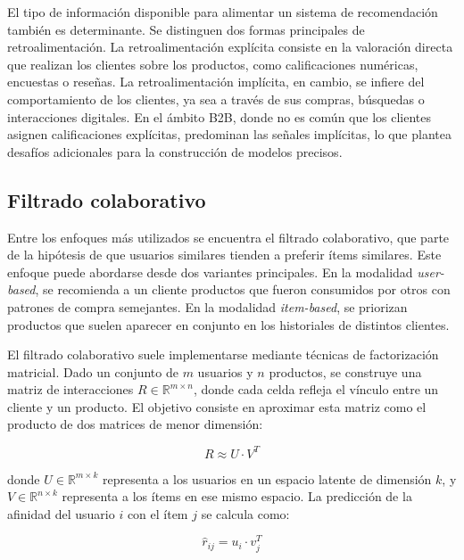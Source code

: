 El tipo de información disponible para alimentar un sistema de recomendación también es determinante. Se distinguen dos formas principales de retroalimentación. La retroalimentación explícita consiste en la valoración directa que realizan los clientes sobre los productos, como calificaciones numéricas, encuestas o reseñas. La retroalimentación implícita, en cambio, se infiere del comportamiento de los clientes, ya sea a través de sus compras, búsquedas o interacciones digitales. En el ámbito B2B, donde no es común que los clientes asignen calificaciones explícitas, predominan las señales implícitas, lo que plantea desafíos adicionales para la construcción de modelos precisos.

\subsection{Filtrado colaborativo}

Entre los enfoques más utilizados se encuentra el filtrado colaborativo, que parte de la hipótesis de que usuarios similares tienden a preferir ítems similares. Este enfoque puede abordarse desde dos variantes principales. En la modalidad \textit{user-based}, se recomienda a un cliente productos que fueron consumidos por otros con patrones de compra semejantes. En la modalidad \textit{item-based}, se priorizan productos que suelen aparecer en conjunto en los historiales de distintos clientes. 

El filtrado colaborativo suele implementarse mediante técnicas de factorización matricial. Dado un conjunto de $m$ usuarios y $n$ productos, se construye una matriz de interacciones $R \in \mathbb{R}^{m \times n}$, donde cada celda refleja el vínculo entre un cliente y un producto. El objetivo consiste en aproximar esta matriz como el producto de dos matrices de menor dimensión:

\begin{equation}
\label{eq:factorizacion}
R \approx U \cdot V^T
\end{equation}

donde $U \in \mathbb{R}^{m \times k}$ representa a los usuarios en un espacio latente de dimensión $k$, y $V \in \mathbb{R}^{n \times k}$ representa a los ítems en ese mismo espacio. La predicción de la afinidad del usuario $i$ con el ítem $j$ se calcula como:

\begin{equation}
\label{eq:prediccion_cf}
\hat{r}_{ij} = u_i \cdot v_j^T
\end{equation}

